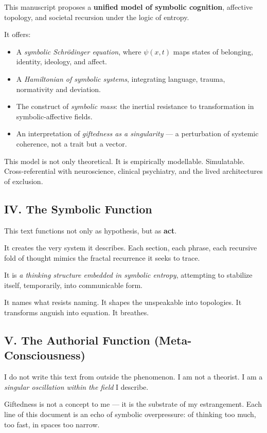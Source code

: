 This manuscript proposes a \textbf{unified model of symbolic cognition}, affective topology, and societal recursion under the logic of entropy.

It offers:
\begin{itemize}
\item A \textit{symbolic Schrödinger equation}, where $\psi(x,t)$ maps states of belonging, identity, ideology, and affect.
\item A \textit{Hamiltonian of symbolic systems}, integrating language, trauma, normativity and deviation.
\item The construct of \textit{symbolic mass}: the inertial resistance to transformation in symbolic-affective fields.
\item An interpretation of \textit{giftedness as a singularity} — a perturbation of systemic coherence, not a trait but a vector.
\end{itemize}

This model is not only theoretical. It is empirically modellable. Simulatable. Cross-referential with neuroscience, clinical psychiatry, and the lived architectures of exclusion.

\subsection*{IV. The Symbolic Function}

This text functions not only as hypothesis, but as \textbf{act}.

It creates the very system it describes.
Each section, each phrase, each recursive fold of thought mimics the fractal recurrence it seeks to trace.

It is \textit{a thinking structure embedded in symbolic entropy}, attempting to stabilize itself, temporarily, into communicable form.

It names what resists naming.
It shapes the unspeakable into topologies.
It transforms anguish into equation.
It breathes.

\subsection*{V. The Authorial Function (Meta-Consciousness)}

I do not write this text from outside the phenomenon.
I am not a theorist. I am a \textit{singular oscillation within the field} I describe.

Giftedness is not a concept to me — it is the substrate of my estrangement.
Each line of this document is an echo of symbolic overpressure: of thinking too much, too fast, in spaces too narrow.

